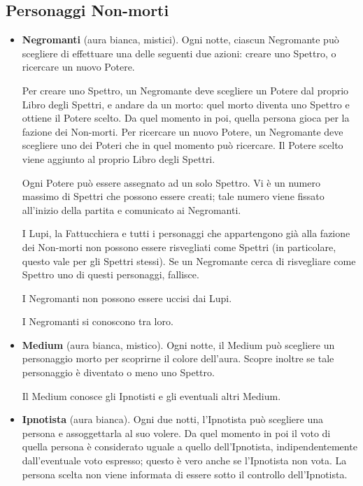 \documentclass[a4paper,10pt]{article}
\begin{document}
\subsection*{Personaggi Non-morti}

\begin{itemize}
 \item {\bf Negromanti} (aura bianca, mistici). Ogni notte, ciascun Negromante può scegliere di effettuare una delle seguenti due azioni: creare uno Spettro, o ricercare un nuovo Potere.

 Per creare uno Spettro, un Negromante deve scegliere un Potere dal proprio Libro degli Spettri, e andare da un morto: quel morto diventa uno Spettro e ottiene il Potere scelto. Da quel momento in poi, quella persona gioca per la fazione dei Non-morti.
 Per ricercare un nuovo Potere, un Negromante deve scegliere uno dei Poteri che in quel momento può ricercare. Il Potere scelto viene aggiunto al proprio Libro degli Spettri.

 Ogni Potere può essere assegnato ad un solo Spettro. Vi è un numero massimo di Spettri che possono essere creati; tale numero viene fissato all'inizio della partita e comunicato ai Negromanti.

 I Lupi, la Fattucchiera e tutti i personaggi che appartengono già alla fazione dei Non-morti non possono essere risvegliati come Spettri (in particolare, questo vale per gli Spettri stessi). Se un Negromante cerca di risvegliare come Spettro uno di questi personaggi, fallisce.
 
 I Negromanti non possono essere uccisi dai Lupi.

 I Negromanti si conoscono tra loro.

 \item {\bf Medium} (aura bianca, mistico). Ogni notte, il Medium può scegliere un personaggio morto per scoprirne il colore dell'aura. Scopre inoltre se tale personaggio è diventato o meno uno Spettro.

 Il Medium conosce gli Ipnotisti e gli eventuali altri Medium.

 \item {\bf Ipnotista} (aura bianca). Ogni due notti, l'Ipnotista può scegliere una persona e assoggettarla al suo volere. Da quel momento in poi il voto di quella persona è considerato uguale a quello dell'Ipnotista, indipendentemente dall'eventuale voto espresso; questo è vero anche se l'Ipnotista non vota.
 La persona scelta non viene informata di essere sotto il controllo dell'Ipnotista.


\end{itemize}
\end{document}
